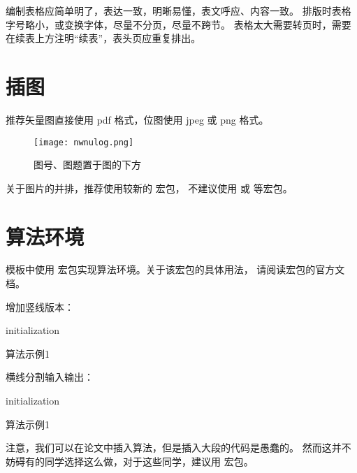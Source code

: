 编制表格应简单明了，表达一致，明晰易懂，表文呼应、内容一致。
排版时表格字号略小，或变换字体，尽量不分页，尽量不跨节。
表格太大需要转页时，需要在续表上方注明“续表”，表头页应重复排出。



\section{插图}

推荐矢量图直接使用 pdf 格式，位图使用 jpeg 或 png 格式。

\begin{figure}[ht]
  \centering
  \texttt{[image: nwnulog.png]}
  \caption{图号、图题置于图的下方}
  \label{fig:badge}
\end{figure}

关于图片的并排，推荐使用较新的  宏包，
不建议使用  或  等宏包。



\section{算法环境}

模板中使用  宏包实现算法环境。关于该宏包的具体用法，
请阅读宏包的官方文档。


增加竖线版本：
\begin{algorithm}
  \SetAlgoLined

  initialization\;
  \caption{算法示例1}
  \label{algo:algorithm1}
\end{algorithm}


横线分割输入输出：
\begin{algorithm}
  \algline
  initialization\;
  \caption{算法示例1}
  \label{algo:algorithm2}
\end{algorithm}


注意，我们可以在论文中插入算法，但是插入大段的代码是愚蠢的。
然而这并不妨碍有的同学选择这么做，对于这些同学，建议用  宏包。

